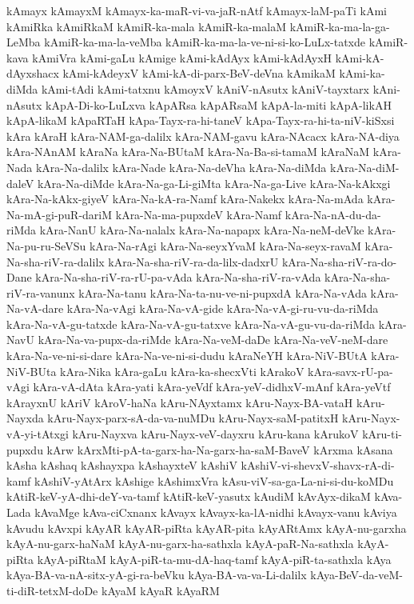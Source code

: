 {kAmayx
kAmayxM
kAmayx-ka-maR-vi-va-jaR-nAtf
kAmayx-laM-paTi
kAmi
kAmiRka
kAmiRkaM
kAmiR-ka-mala
kAmiR-ka-malaM
kAmiR-ka-ma-la-ga-LeMba
kAmiR-ka-ma-la-veMba
kAmiR-ka-ma-la-ve-ni-si-ko-LuLx-tatxde
kAmiR-kava
kAmiVra
kAmi-gaLu
kAmige
kAmi-kAdAyx
kAmi-kAdAyxH
kAmi-kA-dAyxshacx
kAmi-kAdeyxV
kAmi-kA-di-parx-BeV-deVna
kAmikaM
kAmi-ka-diMda
kAmi-tAdi
kAmi-tatxnu
kAmoyxV
kAniV-nAsutx
kAniV-tayxtarx
kAni-nAsutx
kApA-Di-ko-LuLxva
kApARsa
kApARsaM
kApA-la-miti
kApA-likAH
kApA-likaM
kApaRTaH
kApa-Tayx-ra-hi-taneV
kApa-Tayx-ra-hi-ta-niV-kiSxsi
kAra
kAraH
kAra-NAM-ga-dalilx
kAra-NAM-gavu
kAra-NAcacx
kAra-NA-diya
kAra-NAnAM
kAraNa
kAra-Na-BUtaM
kAra-Na-Ba-si-tamaM
kAraNaM
kAra-Nada
kAra-Na-dalilx
kAra-Nade
kAra-Na-deVha
kAra-Na-diMda
kAra-Na-diM-daleV
kAra-Na-diMde
kAra-Na-ga-Li-giMta
kAra-Na-ga-Live
kAra-Na-kAkxgi
kAra-Na-kAkx-giyeV
kAra-Na-kA-ra-Namf
kAra-Nakekx
kAra-Na-mAda
kAra-Na-mA-gi-puR-dariM
kAra-Na-ma-pupxdeV
kAra-Namf
kAra-Na-nA-du-da-riMda
kAra-NanU
kAra-Na-nalalx
kAra-Na-napapx
kAra-Na-neM-deVke
kAra-Na-pu-ru-SeVSu
kAra-Na-rAgi
kAra-Na-seyxYvaM
kAra-Na-seyx-ravaM
kAra-Na-sha-riV-ra-dalilx
kAra-Na-sha-riV-ra-da-lilx-dadxrU
kAra-Na-sha-riV-ra-do-Dane
kAra-Na-sha-riV-ra-rU-pa-vAda
kAra-Na-sha-riV-ra-vAda
kAra-Na-sha-riV-ra-vanunx
kAra-Na-tanu
kAra-Na-ta-nu-ve-ni-pupxdA
kAra-Na-vAda
kAra-Na-vA-dare
kAra-Na-vAgi
kAra-Na-vA-gide
kAra-Na-vA-gi-ru-vu-da-riMda
kAra-Na-vA-gu-tatxde
kAra-Na-vA-gu-tatxve
kAra-Na-vA-gu-vu-da-riMda
kAra-NavU
kAra-Na-va-pupx-da-riMde
kAra-Na-veM-daDe
kAra-Na-veV-neM-dare
kAra-Na-ve-ni-si-dare
kAra-Na-ve-ni-si-dudu
kAraNeYH
kAra-NiV-BUtA
kAra-NiV-BUta
kAra-Nika
kAra-gaLu
kAra-ka-shecxVti
kArakoV
kAra-savx-rU-pa-vAgi
kAra-vA-dAta
kAra-yati
kAra-yeVdf
kAra-yeV-didhxV-mAnf
kAra-yeVtf
kArayxnU
kAriV
kAroV-haNa
kAru-NAyxtamx
kAru-Nayx-BA-vataH
kAru-Nayxda
kAru-Nayx-parx-sA-da-va-nuMDu
kAru-Nayx-saM-patitxH
kAru-Nayx-vA-yi-tAtxgi
kAru-Nayxva
kAru-Nayx-veV-dayxru
kAru-kana
kArukoV
kAru-ti-pupxdu
kArw
kArxMti-pA-ta-garx-ha-Na-garx-ha-saM-BaveV
kArxma
kAsana
kAsha
kAshaq
kAshayxpa
kAshayxteV
kAshiV
kAshiV-vi-shevxV-shavx-rA-di-kamf
kAshiV-yAtArx
kAshige
kAshimxVra
kAsu-viV-sa-ga-La-ni-si-du-koMDu
kAtiR-keV-yA-dhi-deY-va-tamf
kAtiR-keV-yasutx
kAudiM
kAvAyx-dikaM
kAva-Lada
kAvaMge
kAva-ciCxnanx
kAvayx
kAvayx-ka-lA-nidhi
kAvayx-vanu
kAviya
kAvudu
kAvxpi
kAyAR
kAyAR-piRta
kAyAR-pita
kAyARtAmx
kAyA-nu-garxha
kAyA-nu-garx-haNaM
kAyA-nu-garx-ha-sathxla
kAyA-paR-Na-sathxla
kAyA-piRta
kAyA-piRtaM
kAyA-piR-ta-mu-dA-haq-tamf
kAyA-piR-ta-sathxla
kAya
kAya-BA-va-nA-sitx-yA-gi-ra-beVku
kAya-BA-va-va-Li-dalilx
kAya-BeV-da-veM-ti-diR-tetxM-doDe
kAyaM
kAyaR
kAyaRM
}
